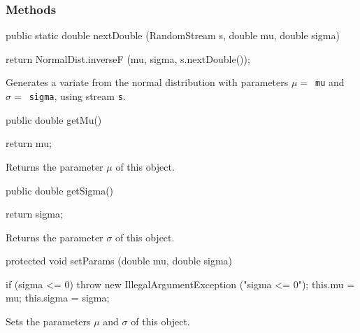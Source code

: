 \subsubsection* {Methods}
\begin{code}

   public static double nextDouble (RandomStream s, double mu, double sigma) \begin{hide} {
      return NormalDist.inverseF (mu, sigma, s.nextDouble());
   }\end{hide}
\end{code}
 \begin{tabb}  Generates a variate from the normal distribution with
   parameters $\mu = $~\texttt{mu} and $\sigma = $~\texttt{sigma}, using
   stream \texttt{s}.
 \end{tabb}
\begin{code}

   public double getMu()\begin{hide} {
      return mu;
   }\end{hide}
\end{code}
  \begin{tabb}  Returns the parameter $\mu$ of this object.
  \end{tabb}
\begin{code}

   public double getSigma()\begin{hide} {
      return sigma;
   }\end{hide}
\end{code}
  \begin{tabb}  Returns the parameter $\sigma$ of this object.
  \end{tabb}
\begin{hide}\begin{code}

   protected void setParams (double mu, double sigma)\begin{hide} {
      if (sigma <= 0)
         throw new IllegalArgumentException ("sigma <= 0");
      this.mu = mu;
      this.sigma = sigma;
   }\end{hide}
\end{code}
  \begin{tabb}  Sets the parameters $\mu$ and $\sigma$ of this object.
  \end{tabb}
\begin{code}
}
\end{code}
\end{hide}
